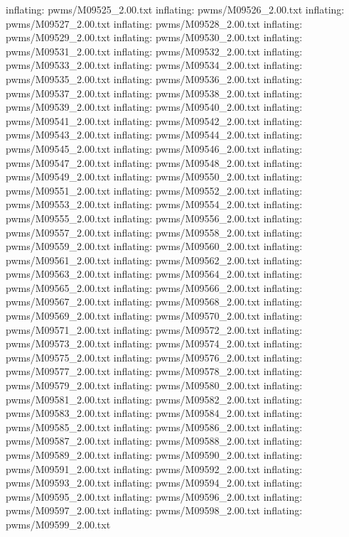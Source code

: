 \documentclass[letterpaper,10pt,english]{sphinxmanual}
\begin{document}
{\begin{sphinxVerbatim}[commandchars=\\\{\}]
  inflating: pwms/M09525\_2.00.txt
  inflating: pwms/M09526\_2.00.txt
  inflating: pwms/M09527\_2.00.txt
  inflating: pwms/M09528\_2.00.txt
  inflating: pwms/M09529\_2.00.txt
  inflating: pwms/M09530\_2.00.txt
  inflating: pwms/M09531\_2.00.txt
  inflating: pwms/M09532\_2.00.txt
  inflating: pwms/M09533\_2.00.txt
  inflating: pwms/M09534\_2.00.txt
  inflating: pwms/M09535\_2.00.txt
  inflating: pwms/M09536\_2.00.txt
  inflating: pwms/M09537\_2.00.txt
  inflating: pwms/M09538\_2.00.txt
  inflating: pwms/M09539\_2.00.txt
  inflating: pwms/M09540\_2.00.txt
  inflating: pwms/M09541\_2.00.txt
  inflating: pwms/M09542\_2.00.txt
  inflating: pwms/M09543\_2.00.txt
  inflating: pwms/M09544\_2.00.txt
  inflating: pwms/M09545\_2.00.txt
  inflating: pwms/M09546\_2.00.txt
  inflating: pwms/M09547\_2.00.txt
  inflating: pwms/M09548\_2.00.txt
  inflating: pwms/M09549\_2.00.txt
  inflating: pwms/M09550\_2.00.txt
  inflating: pwms/M09551\_2.00.txt
  inflating: pwms/M09552\_2.00.txt
  inflating: pwms/M09553\_2.00.txt
  inflating: pwms/M09554\_2.00.txt
  inflating: pwms/M09555\_2.00.txt
  inflating: pwms/M09556\_2.00.txt
  inflating: pwms/M09557\_2.00.txt
  inflating: pwms/M09558\_2.00.txt
  inflating: pwms/M09559\_2.00.txt
  inflating: pwms/M09560\_2.00.txt
  inflating: pwms/M09561\_2.00.txt
  inflating: pwms/M09562\_2.00.txt
  inflating: pwms/M09563\_2.00.txt
  inflating: pwms/M09564\_2.00.txt
  inflating: pwms/M09565\_2.00.txt
  inflating: pwms/M09566\_2.00.txt
  inflating: pwms/M09567\_2.00.txt
  inflating: pwms/M09568\_2.00.txt
  inflating: pwms/M09569\_2.00.txt
  inflating: pwms/M09570\_2.00.txt
  inflating: pwms/M09571\_2.00.txt
  inflating: pwms/M09572\_2.00.txt
  inflating: pwms/M09573\_2.00.txt
  inflating: pwms/M09574\_2.00.txt
  inflating: pwms/M09575\_2.00.txt
  inflating: pwms/M09576\_2.00.txt
  inflating: pwms/M09577\_2.00.txt
  inflating: pwms/M09578\_2.00.txt
  inflating: pwms/M09579\_2.00.txt
  inflating: pwms/M09580\_2.00.txt
  inflating: pwms/M09581\_2.00.txt
  inflating: pwms/M09582\_2.00.txt
  inflating: pwms/M09583\_2.00.txt
  inflating: pwms/M09584\_2.00.txt
  inflating: pwms/M09585\_2.00.txt
  inflating: pwms/M09586\_2.00.txt
  inflating: pwms/M09587\_2.00.txt
  inflating: pwms/M09588\_2.00.txt
  inflating: pwms/M09589\_2.00.txt
  inflating: pwms/M09590\_2.00.txt
  inflating: pwms/M09591\_2.00.txt
  inflating: pwms/M09592\_2.00.txt
  inflating: pwms/M09593\_2.00.txt
  inflating: pwms/M09594\_2.00.txt
  inflating: pwms/M09595\_2.00.txt
  inflating: pwms/M09596\_2.00.txt
  inflating: pwms/M09597\_2.00.txt
  inflating: pwms/M09598\_2.00.txt
  inflating: pwms/M09599\_2.00.txt

\end{sphinxVerbatim}}
\end{document}
